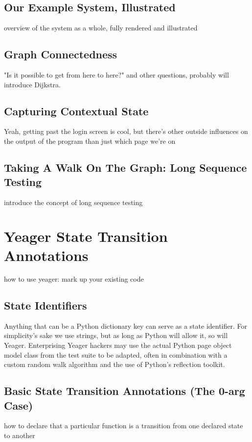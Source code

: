 \subsection{Our Example System, Illustrated}
overview of the system as a whole, fully rendered and illustrated %

\subsection{Graph Connectedness}
"Is it possible to get from here to here?" and other questions, probably will introduce Dijkstra. %

\subsection{Capturing Contextual State}
Yeah, getting past the login screen is cool, but there's other outside influences on the output of the program than just which page we're on %

\subsection{Taking A Walk On The Graph: Long Sequence Testing}
introduce the concept of long sequence testing %

\section{Yeager State Transition Annotations}
how to use yeager: mark up your existing code %

\subsection{State Identifiers}
Anything that can be a Python dictionary key can serve as a state identifier. For simplicity's sake we use strings, but as long as Python will allow it, so will Yeager. Enterprising Yeager hackers may use the actual Python page object model class from the test suite to be adapted, often in combination with a custom random walk algorithm and the use of Python's reflection toolkit.%

\subsection{Basic State Transition Annotations (The 0-arg Case)}
how to declare that a particular function is a transition from one declared state to another %


